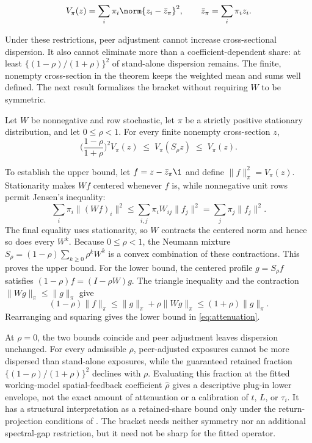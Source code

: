 \begin{equation}\label{eq:cross-sectional-dispersion}
  V_\pi(z)=\sum_i\pi_i\norm{z_i-\bar z_\pi}^2,
  \qquad \bar z_\pi=\sum_i\pi_i z_i .
\end{equation}

Under these restrictions, peer adjustment cannot increase
cross-sectional dispersion.
It also cannot eliminate more than a coefficient-dependent share: at
least $\{(1-\rho)/(1+\rho)\}^2$ of stand-alone dispersion remains.
The finite, nonempty cross-section in the theorem keeps the weighted
mean and sums well defined.
The next result formalizes the bracket without requiring $W$ to be symmetric.

\begin{theorem}\label{thm:spatial-attenuation}
  Let $W$ be nonnegative and row stochastic, let $\pi$ be a strictly positive
  stationary distribution, and let $0\leq\rho<1$. For every finite nonempty
  cross-section $z$,
  \begin{equation}\label{eq:attenuation}
    \Big(\frac{1-\rho}{1+\rho}\Big)^{2}V_\pi(z)
    \;\leq\;
    V_\pi(S_\rho z)
    \;\leq\;
    V_\pi(z).
  \end{equation}
\end{theorem}
To establish the upper bound, let $f=z-\bar z_\pi\1$ and define
$\lVert f\rVert_\pi^2=V_\pi(z)$.
Stationarity makes $Wf$ centered whenever $f$ is, while nonnegative
unit rows permit Jensen's inequality:
\[
  \sum_i\pi_i\lVert(Wf)_i\rVert^2
  \leq\sum_{i,j}\pi_i W_{ij}\lVert f_j\rVert^2
  =\sum_j\pi_j\lVert f_j\rVert^2.
\]
The final equality uses stationarity, so $W$ contracts the centered
norm and hence so does every $W^k$.
Because $0\leq\rho<1$, the Neumann mixture
$S_\rho=(1-\rho)\sum_{k\geq0}\rho^k W^k$ is a convex combination of
these contractions.
This proves the upper bound.
For the lower bound, the centered profile $g=S_\rho f$ satisfies
$(1-\rho)f=(I-\rho W)g$.
The triangle inequality and the contraction $\lVert
Wg\rVert_\pi\leq\lVert g\rVert_\pi$ give
\[
  (1-\rho)\lVert f\rVert_\pi
  \leq\lVert g\rVert_\pi+\rho\lVert Wg\rVert_\pi
  \leq(1+\rho)\lVert g\rVert_\pi.
\]
Rearranging and squaring gives the lower bound in \eqref{eq:attenuation}.

At $\rho=0$, the two bounds coincide and peer adjustment leaves
dispersion unchanged.
For every admissible $\rho$, peer-adjusted exposures cannot be more
dispersed than stand-alone exposures, while the guaranteed retained
fraction $\{(1-\rho)/(1+\rho)\}^2$ declines with $\rho$.
Evaluating this fraction at the fitted working-model spatial-feedback
coefficient $\widehat\rho$ gives a descriptive plug-in lower
envelope, not the exact amount of attenuation or a calibration of
$t$, $L$, or $\tau_i$.
It has a structural interpretation as a retained-share bound only
under the return-projection conditions of
.
The bracket needs neither symmetry nor an additional spectral-gap
restriction, but it need not be sharp for the fitted operator.


